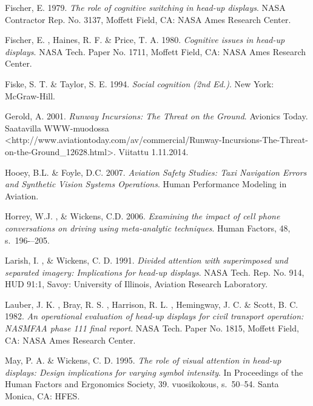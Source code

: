 \documentclass[utf8,bachelor,manualbib]{gradu3}
\begin{document}
\begin{thebibliography}{}
Fischer, E. 1979.
\textit{The role of cognitive switching in head-up displays}.
NASA Contractor Rep. No. 3137, Moffett Field, CA: NASA Ames Research Center.

Fischer, E. , Haines, R. F. \& Price, T. A. 1980.
\textit{Cognitive issues in head-up displays}.
NASA Tech. Paper No. 1711, Moffett Field, CA: NASA Ames Research Center.

Fiske, S. T. \& Taylor, S. E. 1994.
\textit{Social cognition (2nd Ed.)}.
New York: McGraw-Hill.

Gerold, A. 2001.
\textit{Runway Incursions: The Threat on the Ground}.
Avionics Today.
Saatavilla WWW-muodossa
<http://www.aviationtoday.com/av/commercial/Runway-Incursions-The-Threat-on-the-Ground\_12628.html>. Viitattu 1.11.2014.

Hooey, B.L. \& Foyle, D.C. 2007.
\textit{Aviation Safety Studies: Taxi Navigation Errors and Synthetic Vision Systems Operations}.
Human Performance Modeling in Aviation.

Horrey, W.J. , \& Wickens, C.D. 2006.
\textit{Examining the impact of cell phone conversations on driving using meta-analytic techniques}.
Human Factors, 48, s.~196-–205.

Larish, I. , \& Wickens, C. D. 1991.
\textit{Divided attention with superimposed und separated imagery: Implications for head-up displays}.
NASA Tech. Rep. No. 914, HUD 91:1, Savoy: University of Illinois, Aviation Research Laboratory.

Lauber, J. K. , Bray, R. S. , Harrison, R. L. , Hemingway, J. C. \& Scott, B. C. 1982.
\textit{An operational evaluation of head-up displays for civil transport operation: NASMFAA phase 111 final report}.
NASA Tech. Paper No. 1815, Moffett Field, CA: NASA Ames Research Center.

May, P. A. \& Wickens, C. D. 1995.
\textit{The role of visual attention in head-up displays: Design implications
for varying symbol intensity}.
In Proceedings of the Human Factors and Ergonomics Society, 39. vuosikokous, s.~50--54. Santa Monica, CA: HFES.


\end{thebibliography}
\end{document}
